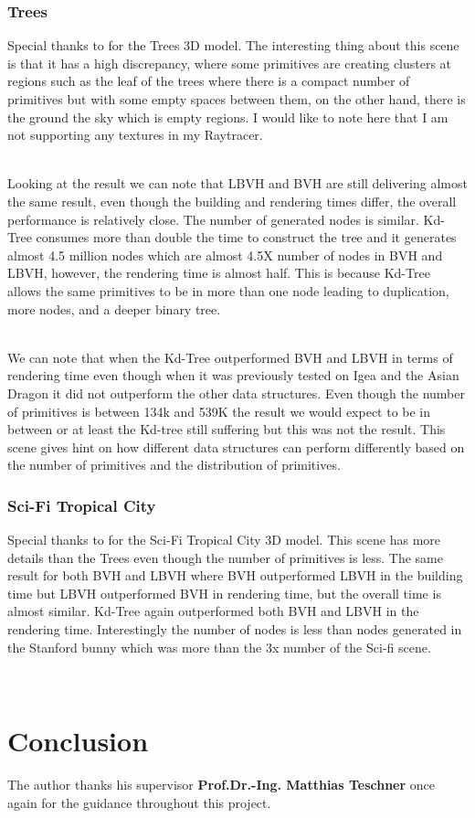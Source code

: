 \documentclass[11pt,a4paper]{article}
\begin{document}
\subsubsection{Trees}
Special thanks to \protect\cite{trees} for the Trees 3D model. The interesting thing about this scene is that it has a high discrepancy, where some primitives are creating clusters at regions such as the leaf of the trees where there is a compact number of primitives but with some empty spaces between them, on the other hand, there is the ground the sky which is empty regions. I would like to note here that I am not supporting any textures in my Raytracer. 


\noindent
\\
Looking at the result we can note that LBVH and BVH are still delivering almost the same result, even though the building and rendering times differ, the overall performance is relatively close. The number of generated nodes is similar. Kd-Tree consumes more than double the time to construct the tree and it generates almost 4.5 million nodes which are almost 4.5X number of nodes in BVH and LBVH, however, the rendering time is almost half. This is because Kd-Tree allows the same primitives to be in more than one node leading to duplication, more nodes, and a deeper binary tree. 

\noindent
\\
We can note that when the Kd-Tree outperformed BVH and LBVH in terms of rendering time even though when it was previously tested on Igea and the Asian Dragon it did not outperform the other data structures. Even though the number of primitives is between 134k and 539K the result we would expect to be in between or at least the Kd-tree still suffering but this was not the result. This scene gives hint on how different data structures can perform differently based on the number of primitives and the distribution of primitives. 
\subsubsection{Sci-Fi Tropical City}
Special thanks to \protect\cite{scifi} for the Sci-Fi Tropical City 3D model.
This scene has more details than the Trees even though the number of primitives is less. The same result for both BVH and LBVH where BVH outperformed LBVH in the building time but LBVH outperformed BVH in rendering time, but the overall time is almost similar. Kd-Tree again outperformed both BVH and LBVH in the rendering time. Interestingly the number of nodes is less than nodes generated in the Stanford bunny which was more than the 3x number of the Sci-fi scene. 

\noindent
\\
\clearpage

\section{Conclusion}
The author thanks his supervisor \textbf{Prof.Dr.-Ing. Matthias Teschner} once again for the guidance throughout this project.
	
\clearpage



\end{document}
